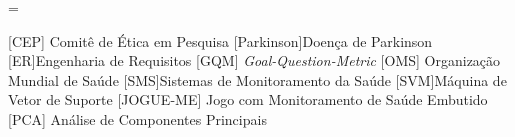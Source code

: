 \documentclass[a4paper,titlepage]{copin}
\begin{document}
\pagestyle{fancy}
\addtolength{\headwidth}{\marginparsep}\addtolength{\headwidth}{\marginparwidth}\headwidth = \textwidth
\renewcommand{\chaptermark}[1]{\markboth{#1}{}}
\renewcommand{\sectionmark}[1]{\markright{\thesection\ #1}}\lhead[\fancyplain{}{\bfseries\thepage}]%
	     {\fancyplain{}{\emph{\rightmark}}}\rhead[\fancyplain{}{\bfseries\leftmark}]%
             {\fancyplain{}{\bfseries\thepage}}\cfoot{}


\Sumario
\ListadeSimbolos
\begin{acronym}
	 [CEP] {Comitê de Ética em Pesquisa}
	[Parkinson]{Doença de Parkinson}
	[ER]{Engenharia de Requisitos}
	 [GQM] {\textit{Goal-Question-Metric}}
	 [OMS] {Organização Mundial de Saúde}	
	 [SMS]{Sistemas de Monitoramento da Saúde}
	 [SVM]{Máquina de Vetor de Suporte}
	 [JOGUE-ME] {Jogo com Monitoramento de Saúde Embutido}
	 [PCA] {Análise de Componentes Principais}
\end{acronym}


\listoffigures
\listoftables
\lstlistoflistings %

\newpage
\cleardoublepage

\Introducao


%
%




	


\end{document}
